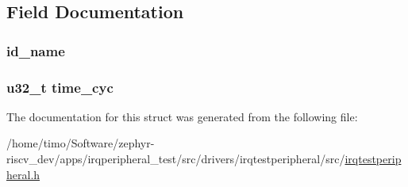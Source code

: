 \subsection{Field Documentation}
\subsubsection[{\texorpdfstring{id\+\_\+name}{id_name}}]{ id\+\_\+name}\hypertarget{struct_drv_value__gen_a5226c1d3c4b403e66022cb0a73132166}{}\label{struct_drv_value__gen_a5226c1d3c4b403e66022cb0a73132166}
\subsubsection[{\texorpdfstring{time\+\_\+cyc}{time_cyc}}]{\setlength{\rightskip}{0pt plus 5cm}u32\+\_\+t time\+\_\+cyc}\hypertarget{struct_drv_value__gen_a916ebe230253097fafdb1a2d73b1a44d}{}\label{struct_drv_value__gen_a916ebe230253097fafdb1a2d73b1a44d}


The documentation for this struct was generated from the following file\+:\begin{DoxyCompactItemize}
\item 
/home/timo/\+Software/zephyr-\/riscv\+\_\+dev/apps/irqperipheral\+\_\+test/src/drivers/irqtestperipheral/src/\hyperlink{irqtestperipheral_8h}{irqtestperipheral.\+h}\end{DoxyCompactItemize}
